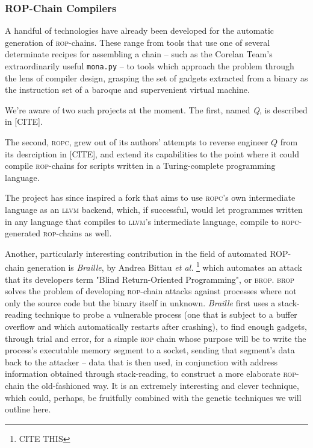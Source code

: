 \subsubsection{ROP-Chain Compilers}

A handful of technologies have already been developed for the
automatic generation of \textsc{rop}-chains. These range from tools that
use one of several determinate recipes for assembling a chain --
such as the {Corelan Team}'s extraordinarily useful
\texttt{mona.py} -- to tools which approach the problem through
the lens of compiler design, grasping the set of gadgets
extracted from a binary as the instruction set of a baroque and
supervenient virtual machine. %

We're aware of two such projects at the moment. The first, named
\emph{Q}, is described in [CITE]. 

The second, \textsc{ropc}, grew out of its authors' attempts to
reverse engineer $Q$ from its desrciption in [CITE], and extend
its capabilities to the point where it could compile \textsc{rop}-chains
for scripts written in a Turing-complete programming language. 

The project has since inspired a fork that aims to use
\textsc{ropc}'s own intermediate language as an \textsc{llvm}
backend, which, if successful, would let programmes written in
any language that compiles to \textsc{llvm}'s intermediate
language, compile to \textsc{ropc}-generated \textsc{rop}-chains
as well.  

Another, particularly interesting contribution in the field of
automated ROP-chain generation is \emph{Braille}, by Andrea
Bittau \emph{et al.}%
\footnote{CITE THIS}
which automates an attack that its developers term "Blind
Return-Oriented Programming", or \textsc{brop}. \textsc{brop}
solves the problem of developing \textsc{rop}-chain attacks
against processes where not only the source code but the binary
itself in unknown. %
\emph{Braille} first uses a stack-reading technique to probe a
vulnerable process (one that is subject to a buffer overflow and
which automatically restarts after crashing), to find enough
gadgets, through trial and error, for a simple \textsc{rop} chain
whose purpose will be to write the process's executable memory
segment to a socket, sending that segment's data back to the
attacker -- data that is then used, in conjunction with address
information obtained through stack-reading, to construct a
more elaborate \textsc{rop}-chain the old-fashioned way. It is an
extremely interesting and clever technique, which could, perhaps,
be fruitfully combined with the genetic techniques we will
outline here. 

